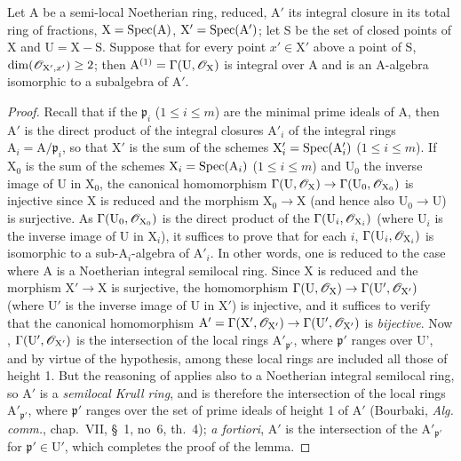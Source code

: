 \begin{lemma}[18.9.7.5]
\label{IV.18.9.7.5}
Let $\mathrm{A}$ be a semi-local Noetherian ring, reduced, $\mathrm{A}'$ its integral closure in its total ring of fractions, $\mathrm{X}=\operatorname{Spec}(\mathrm{A})$, $\mathrm{X}'=\operatorname{Spec}(\mathrm{A}')$;
let S be the set of closed points of $\mathrm{X}$ and $\mathrm{U}=\mathrm{X}-\mathrm{S}$.
Suppose that for every point $x'\in\mathrm{X}'$ above a point of S, $\dim(\mathscr{O}_{\mathrm{X}',x'})\geq 2$;
then $\mathrm{A}^{(1)}=\Gamma(\mathrm{U},\mathscr{O}_{\mathrm{X}})$ is integral over $\mathrm{A}$ and is an A-algebra isomorphic to a subalgebra of $\mathrm{A}'$.
\end{lemma}

\begin{proof}
Recall that if the $\mathfrak{p}_i$ ($1\leq i\leq m$) are the minimal prime ideals of A, then $\mathrm{A}'$ is the direct product of the integral closures $\mathrm{A}'_i$ of the integral rings $\mathrm{A}_i=\mathrm{A}/\mathfrak{p}_i$, so that $\mathrm{X}'$ is the sum of the schemes $\mathrm{X}'_i=\operatorname{Spec}(\mathrm{A}'_i)$ ($1\leq i\leq m$).
If $\mathrm{X}_0$ is the sum of the schemes $\mathrm{X}_i=\operatorname{Spec}(\mathrm{A}_i)$ ($1\leq i\leq m$) and $\mathrm{U}_0$ the inverse image of U in $\mathrm{X}_0$, the canonical homomorphism $\Gamma(\mathrm{U},\mathscr{O}_{\mathrm{X}})\to\Gamma(\mathrm{U}_0,\mathscr{O}_{\mathrm{X}_0})$ is injective since X is reduced and the morphism $\mathrm{X}_0\to\mathrm{X}$ (and hence also $\mathrm{U}_0\to\mathrm{U}$) is surjective.
As $\Gamma(\mathrm{U}_0,\mathscr{O}_{\mathrm{X}_0})$ is the direct product of the $\Gamma(\mathrm{U}_i,\mathscr{O}_{\mathrm{X}_i})$ (where $\mathrm{U}_i$ is the inverse image of U in $\mathrm{X}_i$), it suffices to prove that for each $i$, $\Gamma(\mathrm{U}_i,\mathscr{O}_{\mathrm{X}_i})$ is isomorphic to a sub-$\mathrm{A}_i$-algebra of $\mathrm{A}'_i$.
In other words, one is reduced to the case where A is a Noetherian integral semilocal ring.
Since X is reduced and the morphism $\mathrm{X}'\to\mathrm{X}$ is surjective, the homomorphism $\Gamma(\mathrm{U},\mathscr{O}_{\mathrm{X}})\to\Gamma(\mathrm{U}',\mathscr{O}_{\mathrm{X}'})$ (where $\mathrm{U}'$ is the inverse image of U in $\mathrm{X}'$) is injective, and it suffices to verify that the canonical homomorphism $\mathrm{A}'=\Gamma(\mathrm{X}',\mathscr{O}_{\mathrm{X}'})\to\Gamma(\mathrm{U}',\mathscr{O}_{\mathrm{X}'})$ is \emph{bijective}.
Now , $\Gamma(\mathrm{U}',\mathscr{O}_{\mathrm{X}'})$ is the intersection of the local rings $\mathrm{A}'_{\mathfrak{p}'}$, where $\mathfrak{p}'$ ranges over U', and by virtue of the hypothesis, among these local rings are included all those of height 1.
But the reasoning of  applies also to a Noetherian integral semilocal ring, so $\mathrm{A}'$ is a \emph{semilocal Krull ring}, and is therefore the intersection of the local rings $\mathrm{A}'_{\mathfrak{p}'}$, where $\mathfrak{p}'$ ranges over the set of prime ideals of height 1 of $\mathrm{A}'$ (Bourbaki, \emph{Alg. comm.}, chap.~VII, \S~1, no~6, th.~4);
\emph{a fortiori}, $\mathrm{A}'$ is the intersection of the $\mathrm{A}'_{\mathfrak{p}'}$ for $\mathfrak{p}'\in\mathrm{U}'$, which completes the proof of the lemma.
\end{proof}

